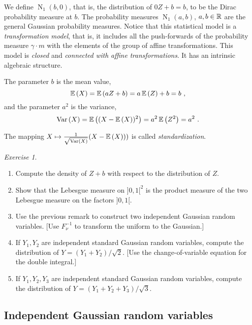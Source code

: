 \documentclass[12pt,a4paper]{amsart}
\newcommand{\gaussian}[3]{\operatorname{N}_{#1}\left(#2,#3\right)}
\theoremstyle{plain}%
\theoremstyle{definition}
\theoremstyle{remark}
\newtheorem{exercise}{Exercise}
\begin{document}
We define $\gaussian 1 b 0$, that is, the distribution of $0Z+b = b$, to be the Dirac probability measure at $b$. 
The probability measures $\gaussian 1 a b$, $a,b \in \mathbb{R}$ are the general Gaussian probability measures. Notice that this statistical model is a \emph{transformation model}, that is, it includes all the push-forwards of the probability measure $\gamma \cdot m$ with the elements of the group of affine transformations. This model is \emph{closed} and \emph{connected with affine transformations}. It has an intrinsic algebraic structure.

The parameter $b$ is the mean value,
\begin{equation*}
  \operatorname{\mathbb E}\left(X\right) = \operatorname{\mathbb E}\left(aZ+b\right) = a \operatorname{\mathbb E}\left(Z\right) + b = b \ ,
\end{equation*}
and the parameter $a^2$ is the variance,
\begin{equation*}
  \operatorname{Var}\left(X\right) = \operatorname{\mathbb E}\left((X - \operatorname{\mathbb E}\left(X\right))^2\right) = a^2 \operatorname{\mathbb E}\left(Z^2\right) = a^2 \ .
\end{equation*}

The mapping $X \mapsto \frac1{\sqrt {\operatorname{Var}\left(X\right)}} (X - \operatorname{\mathbb E}\left(X\right)))$ is called \emph{standardization}.

\begin{exercise}
  \begin{enumerate}
    \item Compute the density of $Z + b$ with respect to the distribution of $Z$.
  \item Show that the Lebesgue measure on $]0,1[^2$ is the product
    measure of the two Lebesgue measure on the factors $]0,1[$.
  \item Use the previous remark to construct two independent Gaussian random variables. [Use $F_\nu^{-1}$ to transform the uniform to the Gaussian.]
  \item If $Y_1,Y_2$ are independent standard Gaussian random variables, compute the distribution of $Y = (Y_1 + Y_2)/\sqrt 2$. [Use the change-of-variable equation for the double integral.]
  \item If $Y_1,Y_2,Y_3$ are independent standard Gaussian random
    variables, compute the distribution of $Y = (Y_1+Y_2+Y_3)/\sqrt 3$.
  \end{enumerate}
\end{exercise}

\subsection{Independent Gaussian random variables}
\end{document}
